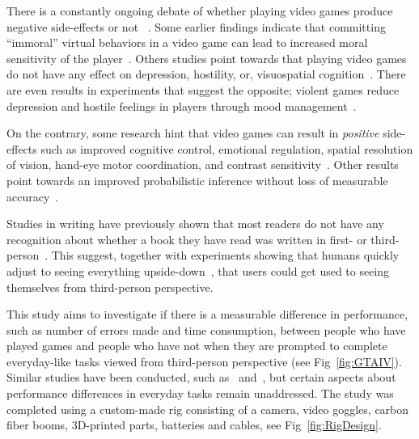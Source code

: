 \documentclass[runningheads,a4paper,oribibl]{llncs}
\begin{document}
There is a constantly ongoing debate of whether playing video games produce negative side-effects or not ~\cite{tear2014video}. Some earlier findings indicate that committing ``immoral'' virtual behaviors in a video game can lead to increased moral sensitivity of the player~\cite{grizzard2014being}. Others studies point towards that playing video games do not have any effect on depression, hostility, or, visuospatial cognition~\cite{valadez2012just}. There are even results in experiments that suggest the opposite; violent games reduce depression and hostile feelings in players through mood management~\cite{ferguson2015hitman}. 

On the contrary, some research hint that video games can result in \emph{positive} side-effects such as improved cognitive control, emotional regulation, spatial resolution of vision, hand-eye motor coordination, and contrast sensitivity~\cite{gong2015enhanced}. Other results point towards an improved probabilistic inference without loss of measurable accuracy~\cite{green2010improved}.

Studies in writing have previously shown that most readers do not have any recognition about whether a book they have read was written in first- or third-person~\cite{hagg2012nya}. This suggest, together with experiments showing that humans quickly adjust to seeing everything upside-down~\cite{kohler1962goggles}, that users could get used to seeing themselves from third-person perspective.

This study aims to investigate if there is a measurable difference in performance, such as number of errors made and time consumption, between people who have played games and people who have not when they are prompted to complete everyday-like tasks viewed from third-person perspective (see Fig~\ref{fig:GTAIV}). Similar studies have been conducted, such as~\cite{schmierbach2011exploring} and~\cite{nakamura20103pi}, but certain aspects about performance differences in everyday tasks remain unaddressed. The study was completed using a custom-made rig consisting of a camera, video goggles, carbon fiber booms, 3D-printed parts, batteries and cables, see Fig~\ref{fig:RigDesign}. 













\end{document}
